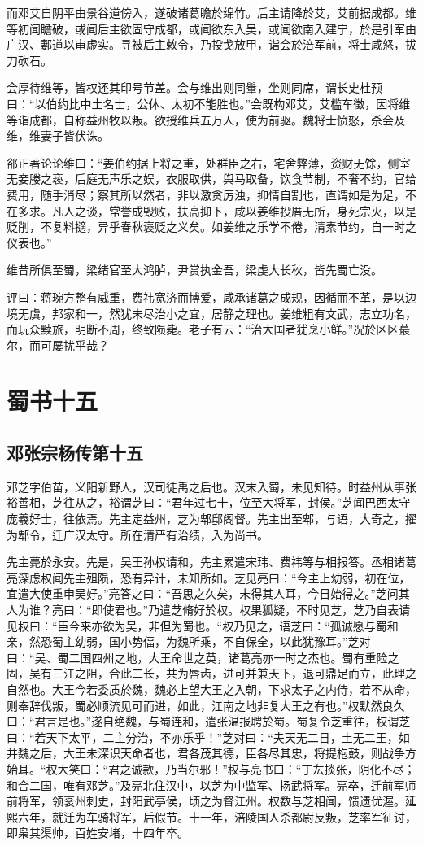 \documentclass[12pt,UTF8]{ctexbook}
\begin{document}
而邓艾自阴平由景谷道傍入，遂破诸葛瞻於绵竹。后主请降於艾，艾前据成都。维等初闻瞻破，或闻后主欲固守成都，或闻欲东入吴，或闻欲南入建宁，於是引军由广汉、郪道以审虚实。寻被后主敕令，乃投戈放甲，诣会於涪军前，将士咸怒，拔刀砍石。

会厚待维等，皆权还其印号节盖。会与维出则同轝，坐则同席，谓长史杜预曰：“以伯约比中土名士，公休、太初不能胜也。”会既构邓艾，艾槛车徵，因将维等诣成都，自称益州牧以叛。欲授维兵五万人，使为前驱。魏将士愤怒，杀会及维，维妻子皆伏诛。

郤正著论论维曰：“姜伯约据上将之重，处群臣之右，宅舍弊薄，资财无馀，侧室无妾媵之亵，后庭无声乐之娱，衣服取供，舆马取备，饮食节制，不奢不约，官给费用，随手消尽；察其所以然者，非以激贪厉浊，抑情自割也，直谓如是为足，不在多求。凡人之谈，常誉成毁败，扶高抑下，咸以姜维投厝无所，身死宗灭，以是贬削，不复料擿，异乎春秋褒贬之义矣。如姜维之乐学不倦，清素节约，自一时之仪表也。”

维昔所俱至蜀，梁绪官至大鸿胪，尹赏执金吾，梁虔大长秋，皆先蜀亡没。

评曰：蒋琬方整有威重，费祎宽济而博爱，咸承诸葛之成规，因循而不革，是以边境无虞，邦家和一，然犹未尽治小之宜，居静之理也。姜维粗有文武，志立功名，而玩众黩旅，明断不周，终致陨毙。老子有云：“治大国者犹烹小鲜。”况於区区蕞尔，而可屡扰乎哉？

\part{蜀书十五}
\chapter{邓张宗杨传第十五}

邓芝字伯苗，义阳新野人，汉司徒禹之后也。汉末入蜀，未见知待。时益州从事张裕善相，芝往从之，裕谓芝曰：“君年过七十，位至大将军，封侯。”芝闻巴西太守庞羲好士，往依焉。先主定益州，芝为郫邸阁督。先主出至郫，与语，大奇之，擢为郫令，迁广汉太守。所在清严有治绩，入为尚书。

先主薨於永安。先是，吴王孙权请和，先主累遣宋玮、费祎等与相报答。丞相诸葛亮深虑权闻先主殂陨，恐有异计，未知所如。芝见亮曰：“今主上幼弱，初在位，宜遣大使重申吴好。”亮答之曰：“吾思之久矣，未得其人耳，今日始得之。”芝问其人为谁？亮曰：“即使君也。”乃遣芝脩好於权。权果狐疑，不时见芝，芝乃自表请见权曰：“臣今来亦欲为吴，非但为蜀也。“权乃见之，语芝曰：“孤诚愿与蜀和亲，然恐蜀主幼弱，国小势偪，为魏所乘，不自保全，以此犹豫耳。”芝对曰：“吴、蜀二国四州之地，大王命世之英，诸葛亮亦一时之杰也。蜀有重险之固，吴有三江之阻，合此二长，共为唇齿，进可并兼天下，退可鼎足而立，此理之自然也。大王今若委质於魏，魏必上望大王之入朝，下求太子之内侍，若不从命，则奉辞伐叛，蜀必顺流见可而进，如此，江南之地非复大王之有也。”权默然良久曰：“君言是也。”遂自绝魏，与蜀连和，遣张温报聘於蜀。蜀复令芝重往，权谓芝曰：“若天下太平，二主分治，不亦乐乎！”芝对曰：“夫天无二日，土无二王，如并魏之后，大王未深识天命者也，君各茂其德，臣各尽其忠，将提枹鼓，则战争方始耳。“权大笑曰：“君之诚款，乃当尔邪！”权与亮书曰：“丁厷掞张，阴化不尽；和合二国，唯有邓芝。”及亮北住汉中，以芝为中监军、扬武将军。亮卒，迁前军师前将军，领衮州刺史，封阳武亭侯，顷之为督江州。权数与芝相闻，馈遗优渥。延熙六年，就迁为车骑将军，后假节。十一年，涪陵国人杀都尉反叛，芝率军征讨，即枭其渠帅，百姓安堵，十四年卒。
\end{document}
